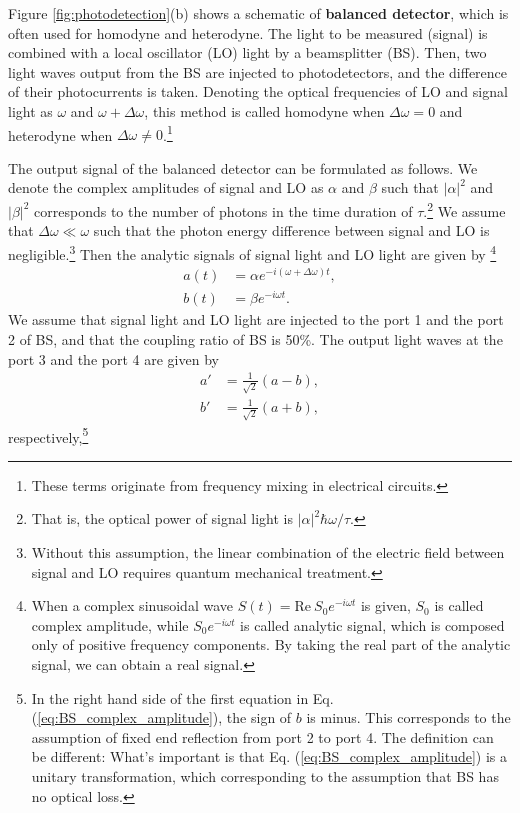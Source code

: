 \documentclass{book}
\begin{document}
Figure \ref{fig:photodetection}(b) shows a schematic of \textbf{balanced detector}, which is often used for homodyne and heterodyne. The light to be measured (signal) is combined with a local oscillator (LO) light by a beamsplitter (BS). Then, two light waves output from the BS are injected to photodetectors, and the difference of their photocurrents is taken. Denoting the optical frequencies of LO and signal light as $\omega$ and $\omega + \Delta \omega$, this method is called homodyne when $\Delta \omega = 0$ and heterodyne when $\Delta \omega \neq 0$.\footnote{These terms originate from frequency mixing in electrical circuits.}

The output signal of the balanced detector can be formulated as follows. We denote the complex amplitudes of signal and LO as $\alpha$ and $\beta$ such that $|\alpha|^2$ and $|\beta|^2$ corresponds to the number of photons in the time duration of $\tau$.\footnote{That is, the optical power of signal light is $|\alpha|^2\hbar \omega/\tau$.} We assume that $\Delta \omega \ll \omega$ such that the photon energy difference between signal and LO is negligible.\footnote{Without this assumption, the linear combination of the electric field between signal and LO requires quantum mechanical treatment.} Then the analytic signals of signal light and LO light are given by
\footnote{When a complex sinusoidal wave $S(t)=\mathrm{Re} \ S_0 e^{-i\omega t}$ is given, $S_0$ is called complex amplitude, while $S_0 e^{-i\omega t}$ is called analytic signal, which is composed only of positive frequency components. By taking the real part of the analytic signal, we can obtain a real signal.}
\begin{equation}
\begin{aligned}
	a(t) &= \alpha e^{-i(\omega + \Delta \omega)t},\\
  	b(t) &= \beta e^{-i\omega t}.
\end{aligned}\label{eq:complex_amplitude}
\end{equation}
We assume that signal light and LO light are injected to the port 1 and the port 2 of BS, and that the coupling ratio of BS is 50\%. The output light waves at the port 3 and the port 4 are given by
\begin{equation}
\begin{aligned}
  a' &= \frac{1}{\sqrt 2}(a - b),\\
  b' &= \frac{1}{\sqrt 2}(a + b),
\end{aligned}\label{eq:BS_complex_amplitude}
\end{equation}
respectively,\footnote{In the right hand side of the first equation in Eq. (\ref{eq:BS_complex_amplitude}), the sign of $b$ is minus. This corresponds to the assumption of fixed end reflection from port 2 to port 4. The definition can be different: What's important is that Eq. (\ref{eq:BS_complex_amplitude}) is a unitary transformation, which corresponding to the assumption that BS has no optical loss.}
\end{document}
